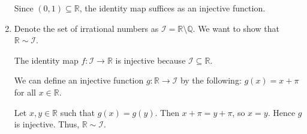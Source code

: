 \documentclass[12pt]{article}
\begin{document}
\begin{enumerate}[start=1,label={\bfseries Exercise \arabic*:},leftmargin=1in]
    Since $(0, 1) \subseteq \mathbb{R}$, the identity map suffices as an injective function.  


    \item Denote the set of irrational numbers as $\mathcal{I} = \mathbb{R} \setminus \mathbb{Q}$. 
    We want to show that $\mathbb{R} \sim \mathcal{I}$. 

    The identity map $f: \mathcal{I} \rightarrow \mathbb{R}$ is injective because $\mathcal{I} \subseteq \mathbb{R}$. 

    We can define an injective function $g: \mathbb{R} \rightarrow \mathcal{I}$ by the following:
    $g(x) = x + \pi$ for all $x \in \mathbb{R}$.

    Let $x, y \in \mathbb{R}$ such that $g(x) = g(y)$. Then $x + \pi = y + \pi$, so $x = y$. Hence $g$ is injective. 
    Thus, $\mathbb{R} \sim \mathcal{I}$.

\end{enumerate}
\end{document}
